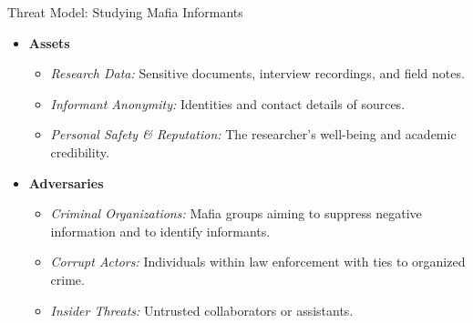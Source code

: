 \documentclass[aspectratio=169]{beamer}
\begin{document}
\begin{frame}{Threat Model: Studying Mafia Informants}
  \begin{itemize}
    \item[] \textbf{Assets}
      \begin{itemize}
        \item \textit{Research Data:} Sensitive documents, interview recordings, and field notes.
        \item \textit{Informant Anonymity:} Identities and contact details of sources.
        \item \textit{Personal Safety \& Reputation:} The researcher’s well-being and academic credibility.
      \end{itemize}
    \item[] \textbf{Adversaries}
      \begin{itemize}
        \item \textit{Criminal Organizations:} Mafia groups aiming to suppress negative information and to identify informants.
        \item \textit{Corrupt Actors:} Individuals within law enforcement with ties to organized crime.
        \item \textit{Insider Threats:} Untrusted collaborators or assistants.
      \end{itemize}
  \end{itemize}
\end{frame}
\end{document}
